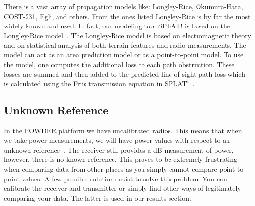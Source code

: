 There is a vast array of propagation models like: Longley-Rice, Okumura-Hata, COST-231, Egli, and others. From the ones listed
Longley-Rice is by far the most widely known and used. In fact, our modeling tool SPLAT! is based on the Longley-Rice 
model~\cite{comparisonof}. The Longley-Rice model is based on electromagnetic theory and on statistical analysis of both terrain features 
and radio measurements. The model can act as an area prediction model or as a point-to-point model. To use the model, one computes the 
additional loss to each path obstruction. These losses are summed and then added to the predicted line of sight path loss which is calculated 
using the Friis transmission equation in SPLAT!~\cite{jeremyclark}.

\subsection*{Unknown Reference}
In the POWDER platform we have uncalibrated radios. This means that when we take power measurements, we will have power 
values with respect to an unknown reference~\cite{pathlossmodels}. The receiver still provides a dB measurement of power, however,
there is no known reference. This proves to be extremely frustrating when comparing data from other places as you simply cannot compare
point-to-point values. A few possible solutions exist to solve this problem. You can calibrate the receiver and transmitter or simply find other
ways of legitimately comparing your data. The latter is used in our results section. 


